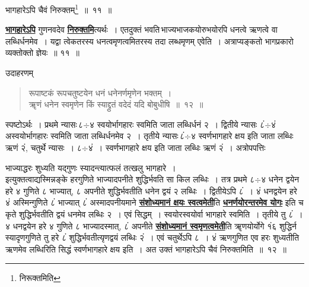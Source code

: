 \documentclass[11pt, openany]{book}
\begin{document}
 \label{11}
\begin{center}
    \ab भागहारेऽपि चैवं निरुक्तम्\renewcommand{\thefootnote}{1}\footnote{निरूक्तमिति}~॥~११~॥
\end{center}

\hyperref[11]{\textbf{भागहारेऽपि}} गुणनवदेव \hyperref[11]{\textbf{निरुक्तमि}}त्यर्थः~। एतदुक्तं भवति\textendash \,भाज्यभाजकयोरुभयोरपि धनत्वे ऋणत्वे वा लब्धिर्धनमेव~। यद्वा त्वेकतरस्य
धनत्वमृणत्वमितरस्य तदा लब्धमृणम् एवेति~। अत्राप्यङ्कतो भागप्रकारो व्यक्तोक्तो ज्ञेयः~॥
११~॥
\newpage

{\bqt उदाहरणम्\textendash \,}
\begin{quote}
    \eg
     रूपाष्टकं रूपचतुष्टयेन धनं धनेनर्णमृणेन भक्तम्~। \\
 ॠणं धनेन स्वमृणेन किं स्याद्द्रुतं वदेदं यदि बोबुधीषि~॥~१२~॥
\end{quote}

 स्पष्टोऽर्थः~। प्रथमे न्यासः\textendash \,८$\div$४ स्वयोर्भागहारः स्वमिति जाता
लब्धिर्धनं २~।
द्वितीये न्यासः ८ं$\div$४ं अस्वयोर्भागहारः स्वमिति जाता लब्धिर्धनमेव २~।
तृतीये न्यासः\textendash \,८ं$\div$४ स्वर्णभागहारे क्षय इति जाता लब्धिः ऋणं २ं, चतुर्थे न्यासः~। ८$÷$४ं~। स्वर्णभागहारे क्षय इति जाता लब्धिः ऋणं २ं~। अत्रोपपत्तिः\textendash \\
\vspace{-4mm}

{\qt भाज्याद्धरः शुध्यति यद्गुणः स्यादन्त्यात्फलं तत्खलु भागहारे}~।\\

\vspace{-4mm}
\noindent इत्युक्तत्वाद्यस्मिन्नङ्के हरगुणिते भाज्यादपनीते शुद्धिर्भवति सा किल
लब्धिः~। तत्र प्रथमे ८$\div$४ धनेन द्वयेन हरे ४ गुणिते ८ भाज्यात्, ८ अपनीते
शुद्धिर्भवतीति धनेन द्वयं २ लब्धिः~। द्वितीयेऽपि ८ं~। ४ं धनद्वयेन हरे
४ं अस्मिन्गुणिते ८ं भाज्यात् ८ं अस्मादपनीयमाने \hyperref[7]{\textbf{संशोध्यमानं क्षयः स्वत्वमेती}}ति \hyperref[3]{\textbf{धनर्णयोरन्तरमेव योगः}} इति च कृते शुद्धिर्भवतीति द्वयं धनमेव लब्धिः २~।
एवं सिद्धम्~। स्वयोरस्वयोर्वा भागहारे स्वमिति~। तृतीये तु ८ं~। ४
धनद्वयेन हरे ४ गुणिते ८ भाज्यादस्मात्, ८ं अपनीते \hyperref[7]{\textbf{संशोध्यमानं स्वमृणत्वमेती}}ति
ॠणयोर्योगे १ं६ शुद्धिर्न स्यादृणगुणिते तु हरे ८ं शुद्धिर्भवतीत्यृणद्वयं
लब्धिः २ं~। एवं चतुर्थेऽपि ८~। ४ं ऋणगुणित एव हरः शुध्यतीति ऋणमेव
लब्धिरिति सिद्धं स्वर्णभागहारे क्षय इति~। अत उक्तं भागहारेऽपि चैवं
निरुक्तमिति~॥~१२~॥\\
\vspace{-2mm}
\end{document}
